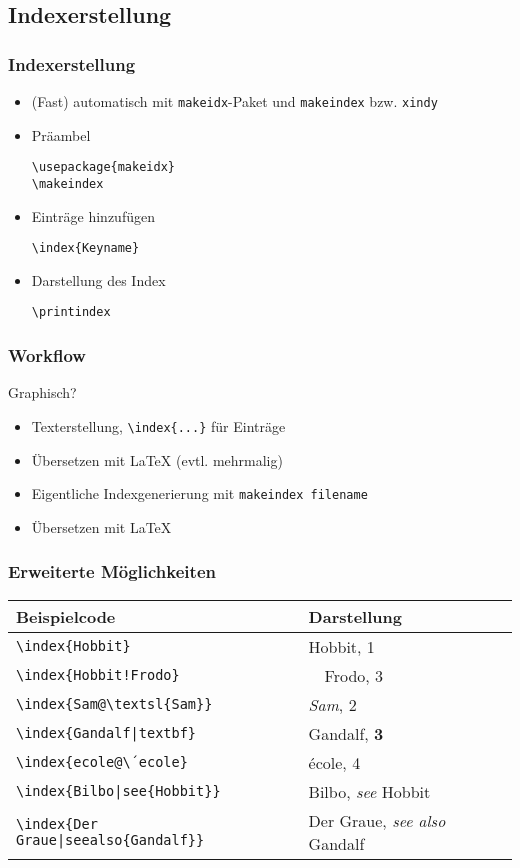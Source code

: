 \subsection{Indexerstellung}
\begin{frame}[fragile]
  \frametitle{Indexerstellung}
  \begin{itemize}
  \item (Fast) automatisch mit \texttt{makeidx}-Paket und
    \texttt{makeindex} bzw. \texttt{xindy}
  \item Präambel
\begin{lstlisting}[language={[LaTeX]TeX}]
\usepackage{makeidx}
\makeindex
\end{lstlisting}
  \item Einträge hinzufügen
\begin{lstlisting}[language={[LaTeX]TeX}]
\index{Keyname}
\end{lstlisting}
  \item Darstellung des Index
\begin{lstlisting}[language={[LaTeX]TeX}]
\printindex
\end{lstlisting}
  \end{itemize}
\end{frame}

\begin{frame}
  \frametitle{Workflow}
  Graphisch?
  \begin{itemize}
  \item Texterstellung, \texttt{\textbackslash index\{...\}} für
    Einträge
  \item Übersetzen mit \LaTeX{} (evtl. mehrmalig)
  \item Eigentliche Indexgenerierung mit \texttt{makeindex filename}
  \item Übersetzen mit \LaTeX{}
  \end{itemize}
\end{frame}

\begin{frame}
  \frametitle{Erweiterte Möglichkeiten}
  \begin{tabular}{l|l}
    \textbf{Beispielcode} & \textbf{Darstellung}\\ \hline
    \texttt{\textbackslash index\{Hobbit\}} & Hobbit, 1\\
    \texttt{\textbackslash index\{Hobbit!Frodo\}} & $\quad$Frodo, 3\\
    \texttt{\textbackslash index\{Sam@\textbackslash textsl\{Sam\}\}}
    & \textsl{Sam}, 2\\
    \texttt{\textbackslash index\{Gandalf|textbf\}} & Gandalf, \textbf{3}\\
    \texttt{\textbackslash index\{ecole@\textbackslash ´ecole\}} &
    école, 4\\
    \texttt{\textbackslash index\{Bilbo|see\{Hobbit\}\}} & Bilbo,
    \emph{see} Hobbit\\
    \texttt{\textbackslash index\{Der Graue|seealso\{Gandalf\}\}} &
    Der Graue, \emph{see also} Gandalf
  \end{tabular}
\end{frame}

